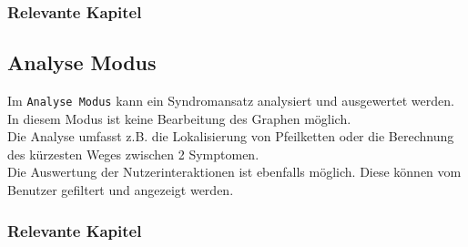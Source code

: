 \documentclass[enabledeprecatedfontcommands,fontsize=11pt,paper=a4,twoside]{scrartcl}
\newcounter{one}
\newcounter{two}[one]
\let\tempone\itemize
\let\temptwo\enditemize
\renewenvironment{itemize}{\tempone\addtolength{\itemsep}{-10.0pt}}{\temptwo}
\begin{document}
\subsubsection{Relevante Kapitel}
\begin{itemize}
	\item {}
	\item {}
	\item {}	
	\item {}	
	\item {}
	\item {}
	\item {}	
	\item {}
	\item {}
	\item {}
	\item {}
	\item {}
	\item {}
	\item {}
	\item {}
	\item {}
	\item {}	
	\item {}
\end{itemize}
\subsection{Analyse Modus}
Im \texttt{Analyse Modus} kann ein Syndromansatz analysiert und ausgewertet werden. In diesem Modus ist keine Bearbeitung des Graphen möglich. \\
Die Analyse umfasst z.B. die Lokalisierung von Pfeilketten oder die Berechnung des kürzesten Weges zwischen 2 Symptomen. \\
Die Auswertung der Nutzerinteraktionen ist ebenfalls möglich. Diese können vom Benutzer gefiltert und angezeigt werden. 
\subsubsection{Relevante Kapitel}
\begin{itemize}
	\item {}	
	\item {}
	\item {}
	\item {}
	\item {}
	\item {}
	\item {}
	\item {}
	\item {}
	\item {}
	\item {}
	\item {}	
	\item {}
	\item {}
\end{itemize}
\end{document}
